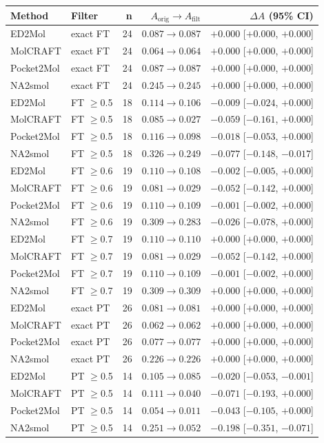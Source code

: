 \setlength{\tabcolsep}{3pt}
\scriptsize
\begin{tabular}{@{}llrrr@{}}
\toprule
\textbf{Method} & \textbf{Filter} & \textbf{n} & \textbf{$A_{\text{orig}}\to A_{\text{filt}}$} & \textbf{$\Delta A$ (95\% CI)} \\
\midrule
ED2Mol & exact FT & 24 & $0.087\to 0.087$ & $+0.000$ [$+0.000$, $+0.000$] \\
MolCRAFT & exact FT & 24 & $0.064\to 0.064$ & $+0.000$ [$+0.000$, $+0.000$] \\
Pocket2Mol & exact FT & 24 & $0.087\to 0.087$ & $+0.000$ [$+0.000$, $+0.000$] \\
NA2smol & exact FT & 24 & $0.245\to 0.245$ & $+0.000$ [$+0.000$, $+0.000$] \\
ED2Mol & FT $\geq$0.5 & 18 & $0.114\to 0.106$ & $-0.009$ [$-0.024$, $+0.000$] \\
MolCRAFT & FT $\geq$0.5 & 18 & $0.085\to 0.027$ & $-0.059$ [$-0.161$, $+0.000$] \\
Pocket2Mol & FT $\geq$0.5 & 18 & $0.116\to 0.098$ & $-0.018$ [$-0.053$, $+0.000$] \\
NA2smol & FT $\geq$0.5 & 18 & $0.326\to 0.249$ & $-0.077$ [$-0.148$, $-0.017$] \\
ED2Mol & FT $\geq$0.6 & 19 & $0.110\to 0.108$ & $-0.002$ [$-0.005$, $+0.000$] \\
MolCRAFT & FT $\geq$0.6 & 19 & $0.081\to 0.029$ & $-0.052$ [$-0.142$, $+0.000$] \\
Pocket2Mol & FT $\geq$0.6 & 19 & $0.110\to 0.109$ & $-0.001$ [$-0.002$, $+0.000$] \\
NA2smol & FT $\geq$0.6 & 19 & $0.309\to 0.283$ & $-0.026$ [$-0.078$, $+0.000$] \\
ED2Mol & FT $\geq$0.7 & 19 & $0.110\to 0.110$ & $+0.000$ [$+0.000$, $+0.000$] \\
MolCRAFT & FT $\geq$0.7 & 19 & $0.081\to 0.029$ & $-0.052$ [$-0.142$, $+0.000$] \\
Pocket2Mol & FT $\geq$0.7 & 19 & $0.110\to 0.109$ & $-0.001$ [$-0.002$, $+0.000$] \\
NA2smol & FT $\geq$0.7 & 19 & $0.309\to 0.309$ & $+0.000$ [$+0.000$, $+0.000$] \\
ED2Mol & exact PT & 26 & $0.081\to 0.081$ & $+0.000$ [$+0.000$, $+0.000$] \\
MolCRAFT & exact PT & 26 & $0.062\to 0.062$ & $+0.000$ [$+0.000$, $+0.000$] \\
Pocket2Mol & exact PT & 26 & $0.077\to 0.077$ & $+0.000$ [$+0.000$, $+0.000$] \\
NA2smol & exact PT & 26 & $0.226\to 0.226$ & $+0.000$ [$+0.000$, $+0.000$] \\
ED2Mol & PT $\geq$0.5 & 14 & $0.105\to 0.085$ & $-0.020$ [$-0.053$, $-0.001$] \\
MolCRAFT & PT $\geq$0.5 & 14 & $0.111\to 0.040$ & $-0.071$ [$-0.193$, $+0.000$] \\
Pocket2Mol & PT $\geq$0.5 & 14 & $0.054\to 0.011$ & $-0.043$ [$-0.105$, $+0.000$] \\
NA2smol & PT $\geq$0.5 & 14 & $0.251\to 0.052$ & $-0.198$ [$-0.351$, $-0.071$] \\
\bottomrule
\end{tabular}


